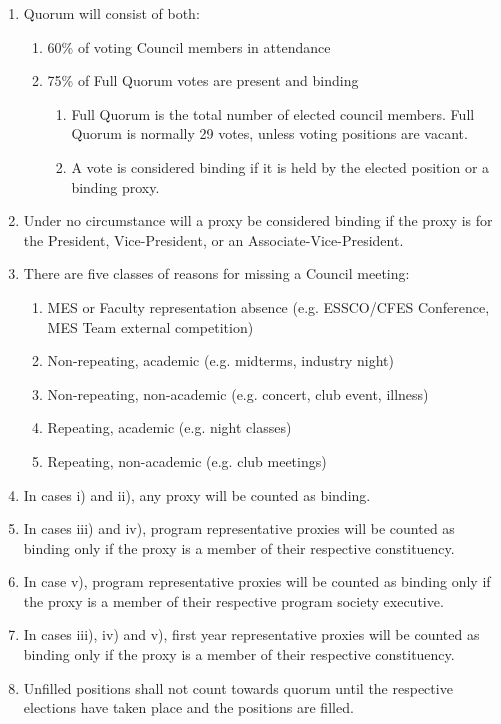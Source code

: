 \begin{enumerate}
 \item
  Quorum will consist of both:

  \begin{enumerate}
   \item
    60\% of voting Council members in attendance
   \item
    75\% of Full Quorum votes are present and binding

    \begin{enumerate}
     \item
      Full Quorum is the total number of elected council members. Full
      Quorum is normally 29 votes, unless voting positions are vacant.
     \item
      A vote is considered binding if it is held by the elected position
      or a binding proxy.
    \end{enumerate}
  \end{enumerate}
 \item
  Under no circumstance will a proxy be considered binding if the proxy
  is for the President, Vice-President, or an Associate-Vice-President.
 \item
  There are five classes of reasons for missing a Council meeting:

  \begin{enumerate}
   \item
    MES or Faculty representation absence (e.g. ESSCO/CFES Conference,
    MES Team external competition)
   \item
    Non-repeating, academic (e.g. midterms, industry night)
   \item
    Non-repeating, non-academic (e.g. concert, club event, illness)
   \item
    Repeating, academic (e.g. night classes)
   \item
    Repeating, non-academic (e.g. club meetings)
  \end{enumerate}
 \item
  In cases i) and ii), any proxy will be counted as binding.
 \item
  In cases iii) and iv), program representative proxies will be counted
  as binding only if the proxy is a member of their respective
  constituency.
 \item
  In case v), program representative proxies will be counted as binding
  only if the proxy is a member of their respective program society
  executive.
 \item
  In cases iii), iv) and v), first year representative proxies will be
  counted as binding only if the proxy is a member of their respective
  constituency.
 \item
  Unfilled positions shall not count towards quorum until the respective
  elections have taken place and the positions are filled.

\end{enumerate}


